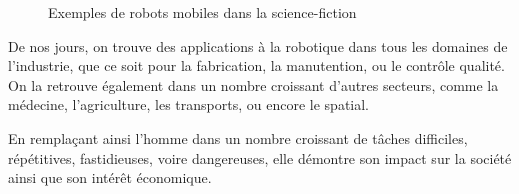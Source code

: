 \documentclass[french,A4paper,]{book}
\begin{document}
\begin{figure}
\centering

\hspace*{\fill}
\hfill%
\hfill%
\hspace*{\fill}

\caption{Exemples de robots mobiles dans la science-fiction}

\label{fig:mobilefiction}

\end{figure}

De nos jours, on trouve des applications à la robotique dans tous les
domaines de l'industrie, que ce soit pour la fabrication, la
manutention, ou le contrôle qualité. On la retrouve également dans un
nombre croissant d'autres secteurs, comme la médecine, l'agriculture,
les transports, ou encore le spatial.

En remplaçant ainsi l'homme dans un nombre croissant de tâches
difficiles, répétitives, fastidieuses, voire dangereuses, elle démontre
son impact sur la société ainsi que son intérêt économique.
\end{document}
